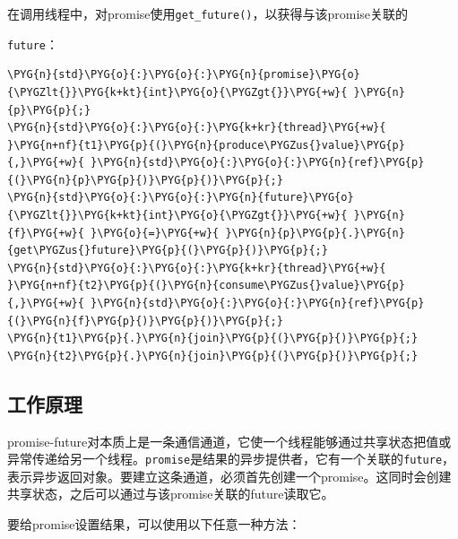 
在调用线程中，对promise使用\texttt{get\_\allowbreak{}future()}，以获得与该promise关联的



\texttt{future}：



\begin{codeblockbg}
\begin{Verbatim}[commandchars=\\\{\},breaklines=true,breakanywhere=true,fontsize=\codefont,xleftmargin=17bp]
\PYG{n}{std}\PYG{o}{:}\PYG{o}{:}\PYG{n}{promise}\PYG{o}{\PYGZlt{}}\PYG{k+kt}{int}\PYG{o}{\PYGZgt{}}\PYG{+w}{ }\PYG{n}{p}\PYG{p}{;}
\PYG{n}{std}\PYG{o}{:}\PYG{o}{:}\PYG{k+kr}{thread}\PYG{+w}{ }\PYG{n+nf}{t1}\PYG{p}{(}\PYG{n}{produce\PYGZus{}value}\PYG{p}{,}\PYG{+w}{ }\PYG{n}{std}\PYG{o}{:}\PYG{o}{:}\PYG{n}{ref}\PYG{p}{(}\PYG{n}{p}\PYG{p}{)}\PYG{p}{)}\PYG{p}{;}
\PYG{n}{std}\PYG{o}{:}\PYG{o}{:}\PYG{n}{future}\PYG{o}{\PYGZlt{}}\PYG{k+kt}{int}\PYG{o}{\PYGZgt{}}\PYG{+w}{ }\PYG{n}{f}\PYG{+w}{ }\PYG{o}{=}\PYG{+w}{ }\PYG{n}{p}\PYG{p}{.}\PYG{n}{get\PYGZus{}future}\PYG{p}{(}\PYG{p}{)}\PYG{p}{;}
\PYG{n}{std}\PYG{o}{:}\PYG{o}{:}\PYG{k+kr}{thread}\PYG{+w}{ }\PYG{n+nf}{t2}\PYG{p}{(}\PYG{n}{consume\PYGZus{}value}\PYG{p}{,}\PYG{+w}{ }\PYG{n}{std}\PYG{o}{:}\PYG{o}{:}\PYG{n}{ref}\PYG{p}{(}\PYG{n}{f}\PYG{p}{)}\PYG{p}{)}\PYG{p}{;}
\PYG{n}{t1}\PYG{p}{.}\PYG{n}{join}\PYG{p}{(}\PYG{p}{)}\PYG{p}{;}
\PYG{n}{t2}\PYG{p}{.}\PYG{n}{join}\PYG{p}{(}\PYG{p}{)}\PYG{p}{;}
\end{Verbatim}
\end{codeblockbg}



\subsection{工作原理}



promise-future对本质上是一条通信通道，它使一个线程能够通过共享状态把值或异常传递给另一个线程。\texttt{promise}是结果的异步提供者，它有一个关联的\texttt{future}，表示异步返回对象。要建立这条通道，必须首先创建一个promise。这同时会创建共享状态，之后可以通过与该promise关联的future读取它。



要给promise设置结果，可以使用以下任意一种方法：



